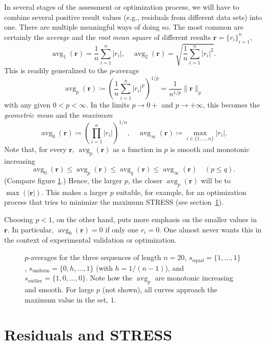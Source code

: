 \documentclass{scrartcl}
\theoremstyle{named}
\DeclareMathOperator{\avg}{avg}
\newcommand\rr{\ensuremath{\bm{r}}}
\begin{document}
In several stages of the assessment or optimization process, we will have to combine
several positive result values (e.g., residuals from different data sets) into one.
There are multiple meaningful ways of doing so. The most common are certainly the
\emph{average} and the \emph{root mean square} of different results
$\rr = \{r_i\}_{i=1}^n$,
\[
  \avg_1(\rr) = \frac{1}{n}\sum_{i=1}^n |r_i|,\quad
  \avg_2(\rr) = \sqrt{\frac{1}{n}\sum_{i=1}^n |r_i|^2}.
\]
This is readily generalized to the $p$-average
\[
  \avg_p(\rr) \coloneqq \left(\frac{1}{n}\sum_{i=1}^n |r_i|^p\right)^{1/p} =
  \frac{1}{n^{1/p}} \|\rr\|_p
\]
with any given $0 < p < \infty$. In the limits $p\to 0+$ and $p\to +\infty$, this
becomes the \emph{geometric mean} and the \emph{maximum}
\[
  \avg_0(\rr) \coloneqq \left(\prod_{i=1}^n |r_i|\right)^{1/n}, \quad
  \avg_{\infty}(\rr) \coloneqq \max_{i\in\{1,\dots,n\}} |r_i|.
\]
Note that, for every $\rr$, $\avg_p(\rr)$ as a function in $p$ is smooth and monotonic
increasing
\[
  \avg_0(\rr) \le \avg_p(\rr) \le \avg_q(\rr) \le \avg_{\infty}(\rr) \quad (p\le q).
\]
(Compare figure \ref{fig:1}.)
Hence, the larger $p$, the closer $\avg_p(\rr)$ will be to $\max(|\rr|)$.
This makes a larger $p$ suitable, for example, for an optimization process that tries to
minimize the maximum STRESS (see section~\ref{}).

Choosing $p < 1$, on the other hand, puts more emphasis on the smaller values in $\rr$.
In particular, $\avg_0(\rr)=0$ if only one $r_i=0$. One almost never wants this in the
context of experimental validation or optimization.

\begin{figure}
  \centering
  
  \caption{$p$-averages for the three sequences of length $n=20$, $s_\text{equal} = \{1,
  \dots, 1\}$, $s_\text{uniform} = \{0, h, \dots,
  1\}$ (with $h = 1 / (n-1)$), and $s_\text{outlier} = \{1, 0,\dots, 0\}$. Note how the
  $\avg_p$ are monotonic increasing and smooth. For large $p$ (not shown), all curves
  approach the maximum value in the set, $1$.}
  \label{fig:1}
\end{figure}


\section{Residuals and STRESS}
\end{document}
